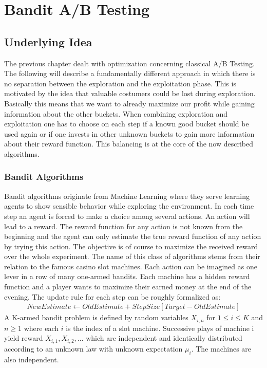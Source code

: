 \documentclass[main.tex]{subfiles}
\begin{document}
\chapter{Bandit A/B Testing}
\section{Underlying Idea}
The previous chapter dealt with optimization concerning classical A/B Testing. The following will describe a fundamentally different approach in which there is no separation between the exploration and the exploitation phase. This is motivated by the idea that valuable costumers could be lost during exploration. Basically this means that we want to already maximize our profit while gaining information about the other buckets. When combining exploration and exploitation one has to choose on each step if a known good bucket should be used again or if one invests in other unknown buckets to gain more information about their reward function. This balancing is at the core of the now described algorithms.

\subsection{Bandit Algorithms}
Bandit algorithms originate from Machine Learning where they serve learning agents to show sensible behavior while exploring the environment. In each time step an agent is forced to make a choice among several actions. An action will lead to a reward. The reward function for any action is not known from the beginning and the agent can only estimate the true reward function of any action by trying this action. The objective is of course to maximize the received reward over the whole experiment. The name of this class of algorithms stems from their relation to the famous casino slot machines. Each action can be imagined as one lever in a row of many one-armed bandits. Each machine has a hidden reward function and a player wants to maximize their earned money at the end of the evening. The update rule for each step can be roughly formalized as:
\begin{align*}
NewEstimate \leftarrow OldEstimate + StepSize[Target - OldEstimate]
\end{align*}
A K-armed bandit problem is defined by random variables $X_{i,n}$ for $1 \leq i \leq K$ and $n\geq1$ where each $i$ is the index of a slot machine. Successive plays of machine i yield reward $X_{i,1},X_{i,2},...$ which are independent and identically distributed according to an unknown law with unknown expectation $\mu_i$. The machines are also independent.
\end{document}
